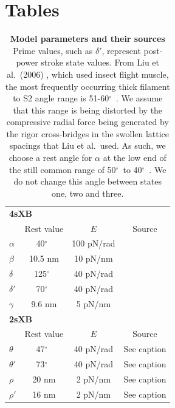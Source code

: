 \documentclass[10pt]{article}
\newcommand{\citep}[1]{\cite{#1}} %
\newcommand{\citet}[1]{\cite{#1}}
\newcommand{\de}{$^\circ$~} %
\begin{document}


\section*{Tables} %

\begin{table}[ht]
    \begin{center}
    \begin{tabular}[t]{|l|ccc|} \hline
    \multicolumn{4}{|l|}{\textbf{4sXB}} \\ 
    \multicolumn{1}{|l}{~} 
              & Rest value & $E$        & Source \\ \cline{2-4}  
    $\alpha$  & 40\de      & 100 pN/rad & \citet{Liu2006}      \\
    $\beta$   & 10.5 nm    & 10 pN/nm   & \citet{Liu2006}      \\
    $\delta$  & 125\de     & 40 pN/rad  & \citet{Taylor1999}   \\
    $\delta'$ & 70\de      & 40 pN/rad  & \citet{Taylor1999}   \\
    $\gamma$  & 9.6 nm     & 5 pN/nm    & \citet{Houdusse2000} \\ \hline
    \multicolumn{4}{|l|}{\textbf{2sXB}} \\ 
    \multicolumn{1}{|l}{~} 
              & Rest value & $E$        & Source      \\ \cline{2-4} 
    $\theta$  & 47\de      & 40 pN/rad  & See caption \\
    $\theta'$ & 73\de      & 40 pN/rad  & See caption \\
    $\rho$    & 20 nm      & 2 pN/nm    & See caption \\
    $\rho'$   & 16 nm      & 2 pN/nm    & See caption \\ \hline
    \end{tabular}
    \caption{ 
	    \label{parameter_table}
	    \textbf{Model parameters and their sources} 
	    Prime values, such as $\delta'$, represent post-power stroke state values. 
	    From Liu et al.~(2006) \citep{Liu2006}, which used insect flight muscle, the most frequently occurring thick filament to S2 angle range is 51-60\de. 
	    We assume that this range is being distorted by the compressive radial force being generated by the rigor cross-bridges in the swollen lattice spacings that Liu et al.~used. 
	    As such, we choose a rest angle for $\alpha$ at the low end of the still common range of 50\de to 40\de. 
	    We do not change this angle between states one, two and three.
}
\end{center}
\end{table}
\end{document}
